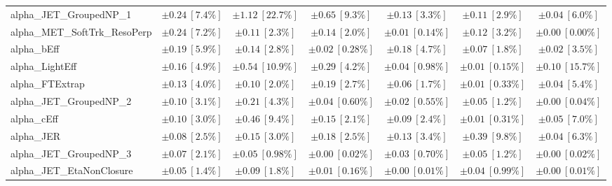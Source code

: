 \begin{sidewaystable}
\begin{center}
\begin{tabular*}{\textwidth}{@{\extracolsep{\fill}}lcccccc}
alpha\_JET\_GroupedNP\_1         & $\pm 0.24\ [7.4\%] $          & $\pm 1.12\ [22.7\%] $          & $\pm 0.65\ [9.3\%] $          & $\pm 0.13\ [3.3\%] $          & $\pm 0.11\ [2.9\%] $          & $\pm 0.04\ [6.0\%] $       \\
alpha\_MET\_SoftTrk\_ResoPerp         & $\pm 0.24\ [7.2\%] $          & $\pm 0.11\ [2.3\%] $          & $\pm 0.14\ [2.0\%] $          & $\pm 0.01\ [0.14\%] $          & $\pm 0.12\ [3.2\%] $          & $\pm 0.00\ [0.00\%] $       \\
alpha\_bEff         & $\pm 0.19\ [5.9\%] $          & $\pm 0.14\ [2.8\%] $          & $\pm 0.02\ [0.28\%] $          & $\pm 0.18\ [4.7\%] $          & $\pm 0.07\ [1.8\%] $          & $\pm 0.02\ [3.5\%] $       \\
alpha\_LightEff         & $\pm 0.16\ [4.9\%] $          & $\pm 0.54\ [10.9\%] $          & $\pm 0.29\ [4.2\%] $          & $\pm 0.04\ [0.98\%] $          & $\pm 0.01\ [0.15\%] $          & $\pm 0.10\ [15.7\%] $       \\
alpha\_FTExtrap         & $\pm 0.13\ [4.0\%] $          & $\pm 0.10\ [2.0\%] $          & $\pm 0.19\ [2.7\%] $          & $\pm 0.06\ [1.7\%] $          & $\pm 0.01\ [0.33\%] $          & $\pm 0.04\ [5.4\%] $       \\
alpha\_JET\_GroupedNP\_2         & $\pm 0.10\ [3.1\%] $          & $\pm 0.21\ [4.3\%] $          & $\pm 0.04\ [0.60\%] $          & $\pm 0.02\ [0.55\%] $          & $\pm 0.05\ [1.2\%] $          & $\pm 0.00\ [0.04\%] $       \\
alpha\_cEff         & $\pm 0.10\ [3.0\%] $          & $\pm 0.46\ [9.4\%] $          & $\pm 0.15\ [2.1\%] $          & $\pm 0.09\ [2.4\%] $          & $\pm 0.01\ [0.31\%] $          & $\pm 0.05\ [7.0\%] $       \\
alpha\_JER         & $\pm 0.08\ [2.5\%] $          & $\pm 0.15\ [3.0\%] $          & $\pm 0.18\ [2.5\%] $          & $\pm 0.13\ [3.4\%] $          & $\pm 0.39\ [9.8\%] $          & $\pm 0.04\ [6.3\%] $       \\
alpha\_JET\_GroupedNP\_3         & $\pm 0.07\ [2.1\%] $          & $\pm 0.05\ [0.98\%] $          & $\pm 0.00\ [0.02\%] $          & $\pm 0.03\ [0.70\%] $          & $\pm 0.05\ [1.2\%] $          & $\pm 0.00\ [0.02\%] $       \\
alpha\_JET\_EtaNonClosure         & $\pm 0.05\ [1.4\%] $          & $\pm 0.09\ [1.8\%] $          & $\pm 0.01\ [0.16\%] $          & $\pm 0.00\ [0.01\%] $          & $\pm 0.04\ [0.99\%] $          & $\pm 0.00\ [0.01\%] $       \\

\end{tabular*}
\end{center}
\end{sidewaystable}
